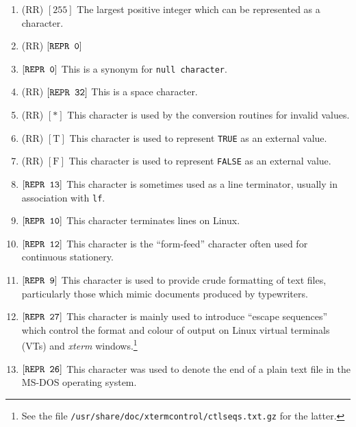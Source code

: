 \begin{enumerate}
\item {}
(RR) $[255]$ \newline
The largest positive integer which can be represented as a character.
\item {}
(RR) $[\mbox{\texttt{REPR 0}}]$
\item {}
$[\mbox{\texttt{REPR 0}}]$ \newline
This is a synonym for \verb|null character|.
\item {}
(RR) $[\mbox{\texttt{REPR 32}}]$ \newline
This is a space character.
\item {}
(RR) $[\ast]$ \newline
This character is used by the conversion routines for invalid values.
\item {} (RR) $[\mbox{T}]$
\newline
This character is used to represent \verb|TRUE| as an external value.
\item {} (RR) $[\mbox{F}]$
\newline
This character is used to represent \verb|FALSE| as an external value.
\item {}
$[\mbox{\texttt{REPR 13}}]$ \newline
This character is sometimes used as a line terminator, usually in
association with \verb|lf|.
\item {}
$[\mbox{\texttt{REPR 10}}]$  \newline
This character terminates lines on Linux.
\item {}
$[\mbox{\texttt{REPR 12}}]$ \newline
This character is the ``form-feed'' character often used for
continuous stationery.
\item {}
$[\mbox{\texttt{REPR 9}}]$ \newline
This character is used to provide crude formatting of text files,
particularly those which mimic documents produced by typewriters.

\item {}
$[\mbox{\texttt{REPR 27}}]$ \newline
This character is mainly used to introduce ``escape sequences'' which
control the format and colour of output on Linux virtual terminals
(VTs) and \textit{xterm} windows.\footnote{See the file
\texttt{/usr/share/doc/xtermcontrol/ctlseqs.txt.gz} for the latter.}
\item {}
$[\mbox{\texttt{REPR 26}}]$ \newline
This character was used to denote the end of a plain text file in the
MS-DOS operating system.
\end{enumerate}

